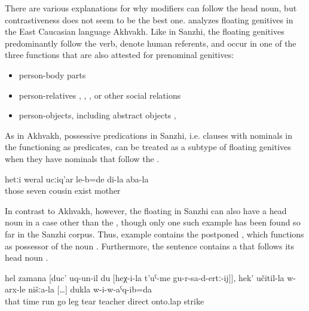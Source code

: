 There are various explanations for why  modifiers can follow the head noun, but contrastiveness does not seem to be the best one. \citet{Creissels2013} analyzes floating genitives in the East Caucasian language Akhvakh. Like in Sanzhi, the floating genitives predominantly follow the verb, denote human referents, and occur in one of the three functions that are also attested for prenominal genitives:
%
\begin{itemize}
	\item	person-body parts
	\item	person-relatives , , , or other social relations 
	\item	person-objects, including abstract objects , 
\end{itemize}

As in Akhvakh, possessive predications in Sanzhi, i.e.  clauses with nominals in the  functioning as predicates, can be treated as a subtype of floating genitives when they have  nominals that follow the  .
%
\begin{exe}
	\ex	\label{ex:‎My mother had seven cousins}
	\gll	hetːi	weral	ucːiq'ar	le-b=de	di-la	aba-la\\
		those	seven	cousin	exist		mother\\
	\glt	{}
\end{exe}

In contrast to Akhvakh, however, the floating  in Sanzhi can also have a head noun in a case other than the , though only one such example has been found so far in the Sanzhi corpus. Thus, example  contains the postponed   , which functions as possessor of the noun  . Furthermore, the sentence contains a  that follows its head noun  .
%
\begin{exe}
	\ex	\label{ex:‎At the time when I run to pull his legs, I fell (lit. hit) directly on the lap of our teacher}
	\gll	hel	zamana	[duc'	uq-un-il	du	[heχ-i-la	t'uˁ-me	gu-r-sa-d-ertː-ij]],	hek'	učitil-la	w-arx-le	nišːa-la	[\ldots]	dukla	w-i-w-aˁq-ib=da\\
		that	time	run	go			leg	tear		teacher	direct	 {}	onto.lap	strike\\
	\glt	{}
\end{exe}

